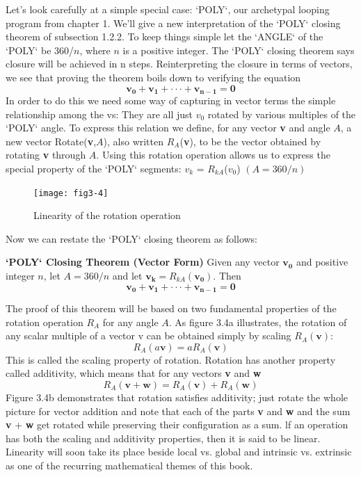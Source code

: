 \documentclass{book}
\begin{document}
Let's look carefully at a simple special case: \textsc{`POLY`}, our archetypal looping
program from chapter 1. We'll give a new interpretation of the \textsc{`POLY`}
closing theorem of subsection 1.2.2. To keep things simple let the \textsc{`ANGLE`}
of the \textsc{`POLY`} be 360/$n$, where $n$ is a positive integer. The \textsc{`POLY`} closing
theorem says closure will be achieved in n steps. Reinterpreting the
closure in terms of vectors, we see that proving the theorem boils down
to verifying the equation
$$\mathbf{v_0}+\mathbf{v_1}+ \cdot \cdot \cdot +\mathbf{v_{n-1}} = \mathbf{0}$$
\noindent In order to do this we need some way of capturing in vector terms the
simple relationship among the vs: They are all just \textbf{$v_0$} rotated by various
multiples of the \textsc{`POLY`} angle. To express this relation we define, for any
vector \textbf{v} and angle $A$, a new vector Rotate(\textbf{v},$A$), also written $R_A$(\textbf{v}),
to be the vector obtained by rotating \textbf{v} through $A$. Using this rotation
operation allows us to express the special property of the \textsc{`POLY`} segments:
\textbf{$v_k$} = $R_{kA}$(\textbf{$v_0$}) $(A = 360/n)$

\begin{figure}
\begin{center}
\texttt{[image: fig3-4]}
\caption{Linearity of the rotation operation}
\end{center}
\end{figure}

Now we can restate the \textsc{`POLY`} closing theorem as follows:

\noindent
\textbf{\textsc{`POLY`} Closing Theorem (Vector Form)} Given any vector $\mathbf{v_0}$ and positive
integer $n$, let $A = 360/ n$ and let $\mathbf{v_k} = R_{kA}(\mathbf{v_0})$. Then
$$\mathbf{v_0}+\mathbf{v_1}+\cdot \cdot \cdot+\mathbf{v_{n-1}} = \mathbf{0}$$

The proof of this theorem will be based on two fundamental properties
of the rotation operation $R_A$ for any angle $A$. As figure 3.4a illustrates,
the rotation of any scalar multiple of a vector v can be obtained simply
by scaling $R_A(\mathbf{v})$:
$$R_A(a\mathbf{v}) = aR_A(\mathbf{v})$$
\noindent This is called the scaling property of rotation. Rotation has another
property called additivity, which means that for any vectors \textbf{v} and \textbf{w}
$$R_A(\mathbf{v} + \mathbf{w}) = R_A(\mathbf{v}) + R_A(\mathbf{w})$$
\noindent Figure 3.4b demonstrates that rotation satisfies additivity; just rotate
the whole picture for vector addition and note that each of the parts \textbf{v}
and \textbf{w} and the sum \textbf{v} + \textbf{w} get rotated while preserving their configuration
as a sum. lf an operation has both the scaling and additivity properties,
then it is said to be linear. Linearity will soon take its place beside local
vs. global and intrinsic vs. extrinsic as one of the recurring mathematical
themes of this book. 
\end{document}
